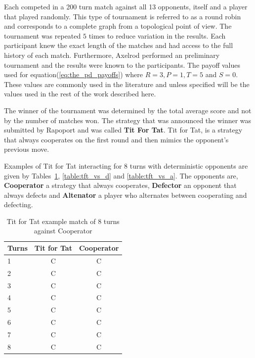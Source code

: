 \documentclass{article}
\theoremstyle{definition}
\begin{document}
Each competed in a 200 turn match against all 13 opponents, itself and a player
that played randomly. This type of tournament is referred to as a round robin and
corresponds to a complete graph from a topological point of view. The tournament
was repeated \(5\) times to reduce variation in the results. Each participant knew
the exact length of the matches and had access to the full history of each match.
Furthermore, Axelrod performed an preliminary tournament and the results were known
to the participants. The payoff values used for equation(\ref{eq:the_pd_payoffs}) where
\(R=3, P=1, T=5\) and \(S=0\). These values are commonly used in the literature
and unless specified will be the values used in the rest of the work described here.

The winner of the tournament was determined by the total average score and not by
the number of matches won. The strategy that was announced the winner was
submitted by Rapoport and was called \textbf{Tit For Tat}. Tit for Tat, is a
strategy that always cooperates on the first round and then mimics the opponent's
previous move.

Examples of Tit for Tat interacting for 8 turns with deterministic opponents are
given by Tables~\ref{table:tft_vs_c}, \ref{table:tft_vs_d} and \ref{table:tft_vs_a}.
The opponents are, \textbf{Cooperator} a strategy that always cooperates,
\textbf{Defector} an opponent that always defects and \textbf{Altenator} a
player who alternates between cooperating and defecting.

\begin{table}[!hbtp]
    \begin{center}
    \begin{tabular}{lcc}
        \toprule
        Turns & Tit for Tat & Cooperator\\
        \toprule
        1 & C & C \\
        2 & C & C \\
        3 & C & C \\
        4 & C & C \\
        5 & C & C \\
        6 & C & C \\
        7 & C & C \\
        8 & C & C \\
        \bottomrule
    \end{tabular}
    \caption{Tit for Tat example match of 8 turns against Cooperator}\label{table:tft_vs_c}
    \end{center}
\end{table}
\end{document}
